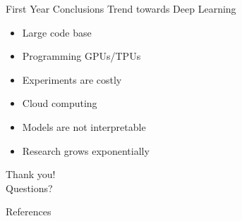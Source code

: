 \documentclass{beamer}
\begin{document}

\begin{frame}{First Year Conclusions}
  \alert{\Large Trend towards Deep Learning}
  \begin{itemize}
    \item Large code base
    \item Programming GPUs/TPUs
    \item Experiments are costly
    \item Cloud computing
    \item Models are not interpretable
    \item Research grows exponentially
  \end{itemize}
\end{frame}


\begin{frame}
  \begin{center}
    \vspace{1.5cm}
    \Huge Thank you! \\
    \huge Questions? \\
    \vspace{1cm}
  \end{center}
\end{frame}

\begin{frame}[allowframebreaks]{References}
  
  
\end{frame}
\end{document}
